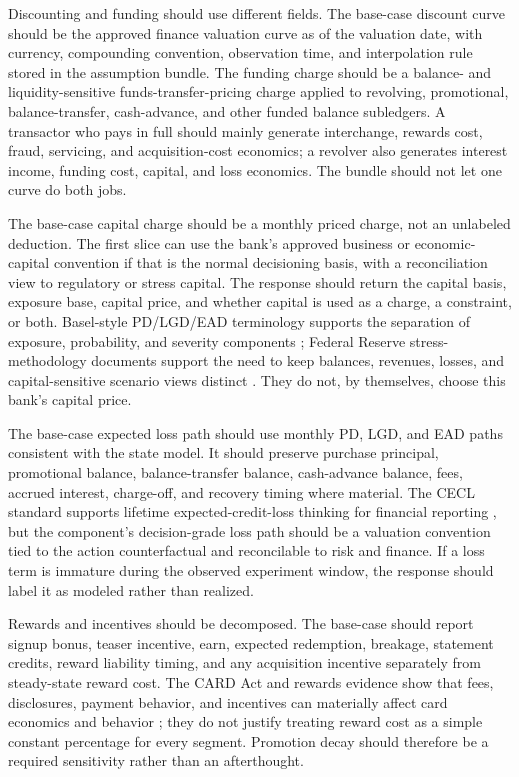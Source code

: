 \documentclass[11pt]{article}
\newcommand{\1}{\mathbf{1}}
\begin{document}
Discounting and funding should use different fields. The base-case discount
curve should be the approved finance valuation curve as of the valuation date,
with currency, compounding convention, observation time, and interpolation rule
stored in the assumption bundle. The funding charge should be a balance- and
liquidity-sensitive funds-transfer-pricing charge applied to revolving,
promotional, balance-transfer, cash-advance, and other funded balance
subledgers. A transactor who pays in full should mainly generate interchange,
rewards cost, fraud, servicing, and acquisition-cost economics; a revolver
also generates interest income, funding cost, capital, and loss economics. The
bundle should not let one curve do both jobs.

The base-case capital charge should be a monthly priced charge, not an
unlabeled deduction. The first slice can use the bank's approved business or
economic-capital convention if that is the normal decisioning basis, with a
reconciliation view to regulatory or stress capital. The response should
return the capital basis, exposure base, capital price, and whether capital is
used as a charge, a constraint, or both. Basel-style PD/LGD/EAD terminology
supports the separation of exposure, probability, and severity components
\citep{bcbs2006basel}; Federal Reserve stress-methodology documents support
the need to keep balances, revenues, losses, and capital-sensitive scenario
views distinct \citep{federalreserve2025stressmethodology,
federalreserve2026stressmethodology}. They do not, by themselves, choose this
bank's capital price.

The base-case expected loss path should use monthly PD, LGD, and EAD paths
consistent with the state model. It should preserve purchase principal,
promotional balance, balance-transfer balance, cash-advance balance, fees,
accrued interest, charge-off, and recovery timing where material. The CECL
standard supports lifetime expected-credit-loss thinking for financial
reporting \citep{fasb2016asu201613}, but the component's decision-grade loss
path should be a valuation convention tied to the action counterfactual and
reconcilable to risk and finance. If a loss term is immature during the
observed experiment window, the response should label it as modeled rather
than realized.

Rewards and incentives should be decomposed. The base-case should report
signup bonus, teaser incentive, earn, expected redemption, breakage, statement
credits, reward liability timing, and any acquisition incentive separately
from steady-state reward cost. The CARD Act and rewards evidence show that
fees, disclosures, payment behavior, and incentives can materially affect card
economics and behavior \citep{agarwal2013cardact,agarwal2010rewards}; they do
not justify treating reward cost as a simple constant percentage for every
segment. Promotion decay should therefore be a required sensitivity rather
than an afterthought.
\end{document}
